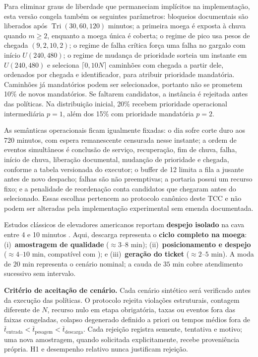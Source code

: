 \documentclass[
  12pt,
  oneside,
  a4paper,
  sumario=tradicional,
  brazil
]{abntex2}
\begin{document}
Para eliminar graus de liberdade que permaneciam impl\'icitos na implementa\c{c}\~ao, esta
vers\~ao congela tamb\'em os seguintes par\^ametros: bloqueios documentais s\~ao liberados
ap\'os $\operatorname{Tri}(30,60,120)$ minutos; a primeira moega \'e exposta \`a chuva
quando $m\geq2$, enquanto a moega \'unica \'e coberta; o regime de pico usa pesos de
chegada $(9,2,10,2)$; o regime de falha cr\'itica for\c{c}a uma falha no gargalo com in\'icio
$U(240,480)$; o regime de mudan\c{c}a de prioridade sorteia um instante em $U(240,480)$
e seleciona $\lceil 0{,}10N\rceil$ caminh\~oes com chegada a partir dele, ordenados por
chegada e identificador, para atribuir prioridade mandat\'oria. Caminh\~oes j\'a mandat\'orios
podem ser selecionados, portanto n\~ao se prometem 10\% de novos mandat\'orios. Se faltarem
candidatos, a inst\^ancia \'e rejeitada antes das pol\'iticas. Na distribui\c{c}\~ao inicial, 20\% recebem prioridade
operacional intermedi\'aria $p=1$, al\'em dos 15\% com prioridade mandat\'oria $p=2$.

As sem\^anticas operacionais ficam igualmente fixadas: o dia sofre corte duro aos 720
minutos, com espera remanescente censurada nesse instante; a ordem de eventos simult\^aneos \'e conclus\~ao de servi\c{c}o,
recupera\c{c}\~ao, fim de chuva, falha, in\'icio de chuva, libera\c{c}\~ao documental,
mudan\c{c}\~ao de prioridade e chegada, conforme a tabela versionada do executor; o
buffer de 12 limita a fila a jusante antes de novo despacho; falhas s\~ao n\~ao preemptivas;
a portaria possui um recurso fixo; e a penalidade de reordena\c{c}\~ao conta candidatos que
chegaram antes do selecionado. Essas escolhas pertencem ao protocolo can\^onico deste TCC e
n\~ao podem ser alteradas pela implementa\c{c}\~ao experimental sem emenda documentada.

Estudos cl\'assicos de elevadores americanos reportam \textbf{despejo isolado} na cava entre 4 e 10 minutos \parencite{r.berrutoAnalyzingReceivingOperation2001a, boulandTruckQueuesCountry1967a}. Aqui, descarga representa o \textbf{ciclo completo na moega}: (i)~\textbf{amostragem de qualidade} ($\approx 3$--$8$ min); (ii)~\textbf{posicionamento e despejo} ($\approx 4$--$10$ min, compat\'ivel com \parencite{r.berrutoAnalyzingReceivingOperation2001a, boulandTruckQueuesCountry1967a}); e (iii)~\textbf{gera\c{c}\~ao do ticket} ($\approx 2$--$5$ min). A moda de $20$ min representa o cen\'ario nominal; a cauda de $35$ min cobre atendimento sucessivo sem intervalo.

\noindent\textbf{Crit\'erio de aceita\c{c}\~ao de cen\'ario.} Cada cen\'ario sint\'etico ser\'a verificado antes da execu\c{c}\~ao das pol\'iticas. O protocolo rejeita viola\c{c}\~oes estruturais, contagem diferente de $N$, recurso nulo em etapa obrigat\'oria, taxas ou eventos fora das faixas congeladas, colapso degenerado definido a priori ou tempos m\'edios fora de $\bar{t}_{\text{entrada}} < \bar{t}_{\text{pesagem}} < \bar{t}_{\text{descarga}}$. Cada rejei\c{c}\~ao registra semente, tentativa e motivo; uma nova amostragem, quando solicitada explicitamente, recebe proveni\^encia pr\'opria. H1 e desempenho relativo nunca justificam rejei\c{c}\~ao.
\end{document}

